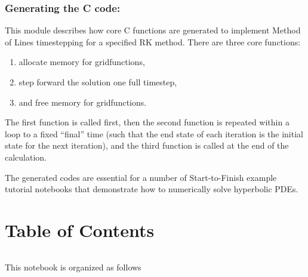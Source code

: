 \documentclass[landscape,letterpaper,10pt,english]{article}
\providecommand{\tightlist}{%
      \setlength{\itemsep}{0pt}\setlength{\parskip}{0pt}}
\begin{document}
\hypertarget{generating-the-c-code}{%
\subsubsection{Generating the C code:}\label{generating-the-c-code}}

This module describes how core C functions are generated to implement
Method of Lines timestepping for a specified RK method. There are three
core functions:

\begin{enumerate}
\def\labelenumi{\arabic{enumi}.}
\tightlist
\item
  allocate memory for gridfunctions,
\item
  step forward the solution one full timestep,
\item
  and free memory for gridfunctions.
\end{enumerate}

The first function is called first, then the second function is repeated
within a loop to a fixed ``final'' time (such that the end state of each
iteration is the initial state for the next iteration), and the third
function is called at the end of the calculation.

The generated codes are essential for a number of Start-to-Finish
example tutorial notebooks that demonstrate how to numerically solve
hyperbolic PDEs.

    \hypertarget{table-of-contents}{%
\section{Table of Contents}\label{table-of-contents}}

\[\label{toc}\]

This notebook is organized as follows
\end{document}
